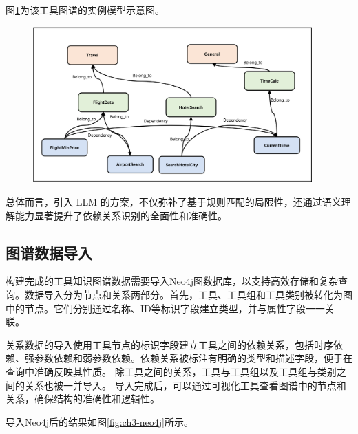 图\ref{fig:ch3-knowledge-graph-instance-model}为该工具图谱的实例模型示意图。

\begin{figure}[H]
    \vspace{1em}
    \centering
    \setlength{\abovecaptionskip}{10pt} %
    \includegraphics[height=6cm]{../assets/图谱实例模型.png}
    \label{fig:ch3-knowledge-graph-instance-model}
\end{figure}

总体而言，引入 LLM 的方案，不仅弥补了基于规则匹配的局限性，还通过语义理解能力显著提升了依赖关系识别的全面性和准确性。

\subsection{图谱数据导入}

构建完成的工具知识图谱数据需要导入Neo4j图数据库，以支持高效存储和复杂查询。数据导入分为节点和关系两部分。首先，工具、工具组和工具类别被转化为图中的节点。它们分别通过名称、ID等标识字段建立类型，并与属性字段一一关联。

关系数据的导入使用工具节点的标识字段建立工具之间的依赖关系，包括时序依赖、强参数依赖和弱参数依赖。依赖关系被标注有明确的类型和描述字段，便于在查询中准确反映其性质。
除工具之间的关系，工具与工具组以及工具组与类别之间的关系也被一并导入。
导入完成后，可以通过可视化工具查看图谱中的节点和关系，确保结构的准确性和逻辑性。

导入Neo4j后的结果如图\ref{fig:ch3-neo4j}所示。

